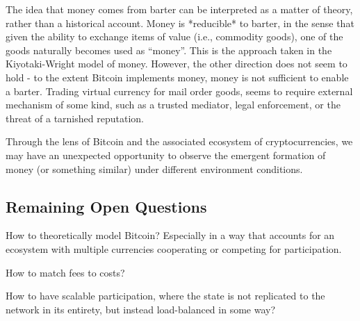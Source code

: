 The idea that money comes from barter can be interpreted as a matter of theory, rather than a historical account. Money is *reducible* to barter, in the sense that given the ability to exchange items of value (i.e., commodity goods), one of the goods naturally becomes used as ``money''. This is the approach taken in the Kiyotaki-Wright model of money. However, the other direction does not seem to hold - to the extent Bitcoin implements money, money is not sufficient to enable a barter. Trading virtual currency for mail order goods, seems to require  external mechanism of some kind, such as a trusted mediator, legal enforcement, or the threat of a tarnished reputation.

Through the lens of Bitcoin and the associated ecosystem of cryptocurrencies, we may have an unexpected opportunity to observe the emergent formation of money (or something similar) under different environment conditions.


\subsection{Remaining Open Questions}

How to theoretically model Bitcoin? Especially in a way that accounts for an ecosystem with multiple currencies cooperating or competing for participation.

How to match fees to costs?

How to have scalable participation, where the state is not replicated to the network in its entirety, but instead load-balanced in some way?
